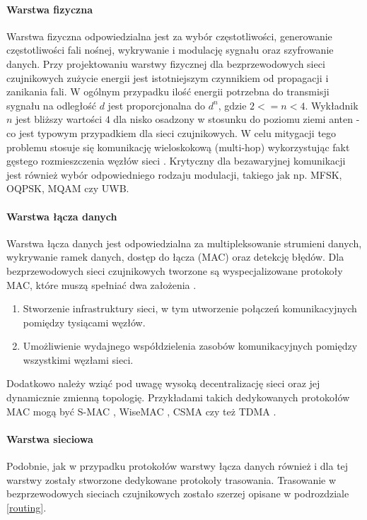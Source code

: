 \paragraph{Warstwa fizyczna}
Warstwa fizyczna odpowiedzialna jest za wybór częstotliwości, generowanie częstotliwości fali nośnej, wykrywanie i modulację sygnału oraz szyfrowanie danych. Przy projektowaniu warstwy fizycznej dla bezprzewodowych sieci czujnikowych zużycie energii jest istotniejszym czynnikiem od propagacji i zanikania fali. W ogólnym przypadku ilość energii potrzebna do transmisji sygnału na odległość $d$ jest proporcjonalna do $d^{n}$, gdzie $2 <= n < 4$. Wykładnik $n$ jest bliższy wartości $4$ dla nisko osadzony w stosunku do poziomu ziemi anten \cite{Sohrabi1999} - co jest typowym przypadkiem dla sieci czujnikowych. W celu mitygacji tego problemu stosuje się komunikację wieloskokową (multi-hop) wykorzystując fakt gęstego rozmieszczenia węzłów sieci \cite{Akyildiz2002.09}.
Krytyczny dla bezawaryjnej komunikacji jest również wybór odpowiedniego rodzaju modulacji, takiego jak np. MFSK, OQPSK, MQAM czy UWB.

\paragraph{Warstwa łącza danych}
Warstwa łącza danych jest odpowiedzialna za multipleksowanie strumieni danych, wykrywanie ramek danych, dostęp do łącza (MAC) oraz detekcję błędów. Dla bezprzewodowych sieci czujnikowych tworzone są wyspecjalizowane protokoły MAC, które muszą spełniać dwa założenia \cite{Akyildiz2002.09, Demirkol2006}.
\begin{enumerate}
\item Stworzenie infrastruktury sieci, w tym utworzenie połączeń komunikacyjnych pomiędzy tysiącami węzłów.
\item Umożliwienie wydajnego współdzielenia zasobów komunikacyjnych pomiędzy wszystkimi węzłami sieci.
\end{enumerate}
Dodatkowo należy wziąć pod uwagę wysoką decentralizację sieci oraz jej dynamicznie zmienną topologię. Przykładami takich dedykowanych protokołów MAC mogą być S-MAC \cite{Ye2002}, WiseMAC \cite{Hoiydi2004}, CSMA \cite{Althobaiti2015} czy też TDMA \cite{Althobaiti2015}.

\paragraph{Warstwa sieciowa}
Podobnie, jak w przypadku protokołów warstwy łącza danych również i dla tej warstwy zostały stworzone dedykowane protokoły trasowania. Trasowanie w bezprzewodowych sieciach czujnikowych zostało szerzej opisane w podrozdziale \ref{routing}.

